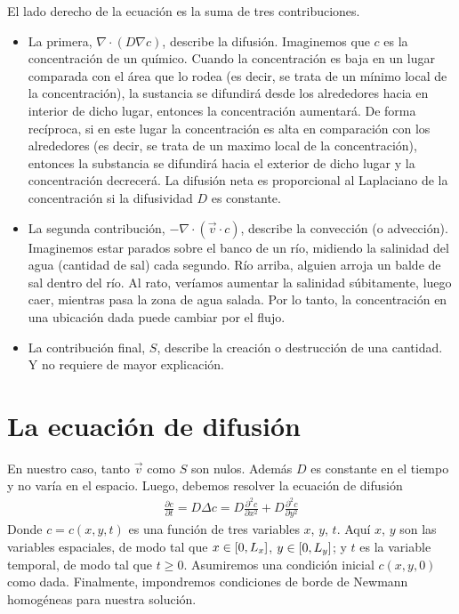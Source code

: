 \documentclass{article}
\newcommand{\leftOpenInterval}{\left]}
\newcommand{\rightOpenInterval}{\right[}
\newcommand{\leftClosedInterval}{\left[}
\newcommand{\rightClosedInterval}{\right]}
\newcommand{\interval}[3]{%
  \ifstrequal{#1}{oo}{%
    \leftOpenInterval #2, #3 \rightOpenInterval%
  }{%
    \ifstrequal{#1}{co}{%
      \leftClosedInterval #2, #3 \rightOpenInterval%
    }{%
      \ifstrequal{#1}{oc}{
        \leftOpenInterval #2, #3 \rightClosedInterval%
      }{%
        \ifstrequal{#1}{cc}{
          \leftClosedInterval #2, #3 \rightClosedInterval
        }{%
        }%
      }%
    }%
  }%
}
\begin{document}
  El lado derecho de la ecuación es la suma de tres contribuciones.
  \begin{itemize}
    \item La primera, \(\nabla \cdot (D \nabla c)\), describe la difusión.
    Imaginemos que \(c\) es la concentración de un químico.
    Cuando la concentración es baja en un lugar comparada con el área que lo rodea (es decir, se trata de un mínimo local de la concentración), la sustancia se difundirá desde los alrededores hacia en interior de dicho lugar, entonces la concentración aumentará.
    De forma recíproca, si en este lugar la concentración es alta en comparación con los alrededores (es decir, se trata de un maximo local de la concentración), entonces la substancia se difundirá hacia el exterior de dicho lugar y la concentración decrecerá.
    La difusión neta es proporcional al Laplaciano de la concentración si la difusividad \(D\) es constante.
    \item La segunda contribución, \(- \nabla \cdot (\vec{v} \cdot c)\), describe la convección (o advección).
    Imaginemos estar parados sobre el banco de un río, midiendo la salinidad del agua (cantidad de sal) cada segundo.
    Río arriba, alguien arroja un balde de sal dentro del río.
    Al rato, veríamos aumentar la salinidad súbitamente, luego caer, mientras pasa la zona de agua salada.
    Por lo tanto, la concentración en una ubicación dada puede cambiar por el flujo.
    \item La contribución final, \(S\), describe la creación o destrucción de una cantidad.
    Y no requiere de mayor explicación.
  \end{itemize}

  \section{La ecuación de difusión}
  En nuestro caso, tanto \(\vec{v}\) como \(S\) son nulos.
  Además \(D\) es constante en el tiempo y no varía en el espacio.
  Luego, debemos resolver la ecuación de difusión
  \begin{align}
    \label{equation:diffusion}
    \frac{\partial c}{\partial t}
    =
    D \Delta c
    =
    D \frac{\partial^2 c}{\partial x^2} + D \frac{\partial^2 c}{\partial y^2}
  \end{align}
  Donde \(c = c(x, y, t)\) es una función de tres variables \(x\), \(y\), \(t\).
  Aquí \(x\), \(y\) son las variables espaciales, de modo tal que \(x \in \interval{cc}{0}{L_x}\), \(y \in \interval{cc}{0}{L_y}\);
  y \(t\) es la variable temporal, de modo tal que \(t \geq 0\).
  Asumiremos una condición inicial \(c(x, y, 0)\) como dada.
  Finalmente, impondremos condiciones de borde de Newmann homogéneas para nuestra solución.
\end{document}
